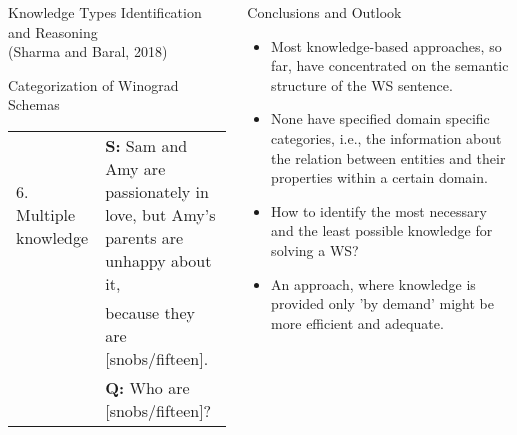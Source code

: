 \documentclass[svgnames, final, 20pt]{beamer} %
\begin{document}
\begin{frame}[fragile]
\begin{columns}[t]
\begin{block}{Knowledge Types Identification and Reasoning\\(Sharma and Baral, 2018)}
\begin{block}{Categorization of Winograd Schemas}
{\begin{tabular}{  l | l  }
		6. Multiple knowledge &\textbf{S:}  		
		Sam and Amy are passionately in love, but Amy's parents are unhappy about it,\\& because they are {\color{myorange}[snobs/fifteen]}.  \\&\textbf{Q:} Who are [snobs/fifteen]?\\ \hline
	\end{tabular} } 

\end{block}
\end{block}
\vspace{-1.5cm}
\begin{block}{Conclusions and Outlook}
\begin{itemize}
 \item  Most knowledge-based approaches, so far, have concentrated on the semantic structure of the WS sentence. 
\item None have specified domain specific categories, i.e., the information about the relation between entities and their properties within a certain domain.
\item How to identify the most necessary and the least possible knowledge for solving a WS?
\item An approach, where knowledge is provided only 'by demand' might be more efficient and adequate.
 
\end{itemize}
\end{block}


\end{columns}

\end{frame}
\end{document}
